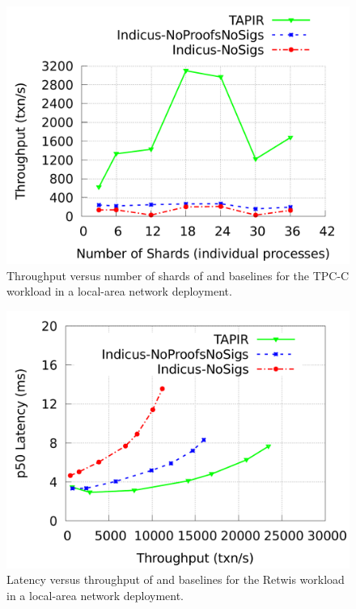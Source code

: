 \begin{figure}
  \includegraphics[width=\columnwidth]{figures/eval/tpcc-tput-shards.pdf}
  \caption{Throughput versus number of shards of \sys{} and baselines for the TPC-C
  workload in a local-area network deployment.}
  \label{fig:tpcc-tput-shards}
\end{figure}

\begin{figure}
  \includegraphics[width=\columnwidth]{figures/eval/retwis-lat-tput.pdf}
  \caption{Latency versus throughput of \sys{} and baselines for the Retwis
  workload in a local-area network deployment.}
  \label{fig:retwis-lat-tput}
\end{figure}


